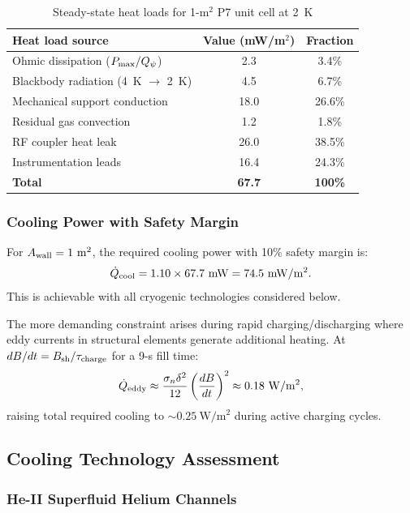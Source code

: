 \documentclass[aps,prd,twocolumn,superscriptaddress]{revtex4-2}
\newcommand{\Pmax}{P_{\rm max}}
\begin{document}
\begin{table}[h]
\centering
\caption{Steady-state heat loads for 1-m$^2$ P7 unit cell at 2~K}
\label{tab:heat_loads}
\begin{tabular}{lcc}
\toprule
Heat load source & Value (mW/m$^2$) & Fraction \\
\midrule
Ohmic dissipation ($\Pmax/Q_\psi$) & 2.3 & 3.4\% \\
Blackbody radiation (4~K $\to$ 2~K) & 4.5 & 6.7\% \\
Mechanical support conduction & 18.0 & 26.6\% \\
Residual gas convection & 1.2 & 1.8\% \\
RF coupler heat leak & 26.0 & 38.5\% \\
Instrumentation leads & 16.4 & 24.3\% \\
\midrule
\textbf{Total} & \textbf{67.7} & \textbf{100\%} \\
\bottomrule
\end{tabular}
\end{table}

\subsubsection{Cooling Power with Safety Margin}

For $A_{\rm wall} = 1~\mathrm{m^2}$, the required cooling power with
10\% safety margin is:
\begin{equation}
\dot{Q}_{\rm cool} = 1.10 \times 67.7~\mathrm{mW}
= 74.5~\mathrm{mW/m^2}.
\end{equation}
This is achievable with all cryogenic technologies considered below.

The more demanding constraint arises during rapid charging/discharging
where eddy currents in structural elements generate additional heating.
At $dB/dt = B_{\rm sh}/\tau_{\rm charge}$ for a 9-s fill time:
\begin{equation}
\dot{Q}_{\rm eddy} \approx \frac{\sigma_n \delta^2}{12}
\left(\frac{dB}{dt}\right)^2
\approx 0.18~\mathrm{W/m^2},
\end{equation}
raising total required cooling to $\sim 0.25~\mathrm{W/m^2}$ during
active charging cycles.

\subsection{Cooling Technology Assessment}

\subsubsection{He-II Superfluid Helium Channels}
\end{document}
